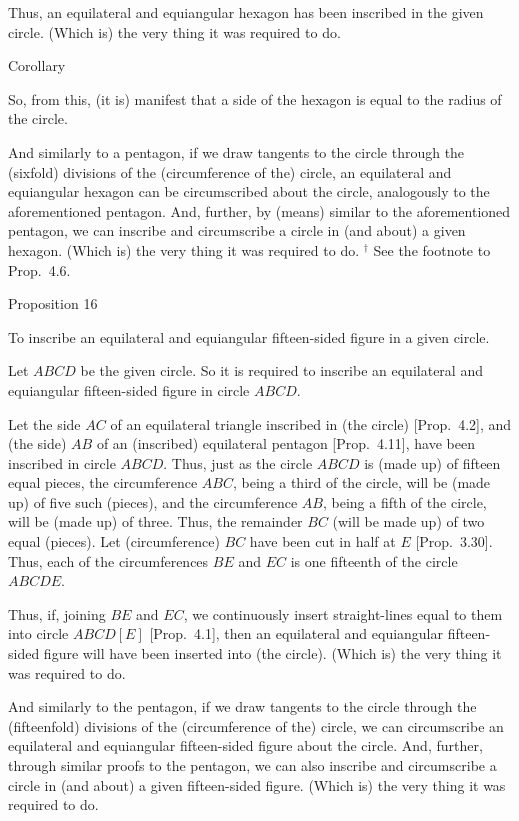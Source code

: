  Thus, an equilateral and equiangular hexagon has been inscribed
 in the given circle. (Which is) the very thing it was required to do.\\
 
 \begin{center}
{\large Corollary}
\end{center}\vspace*{-7pt}

So, from this, (it is) manifest that a side of the hexagon is equal
to the radius of the circle.

And similarly to  a pentagon, if we draw  tangents to the circle through
the (sixfold) divisions of the (circumference of the) circle, an equilateral and equiangular hexagon
can be circumscribed about the circle, analogously to the aforementioned pentagon. And, further, by (means) similar to the aforementioned pentagon,
we can inscribe and circumscribe a circle in (and about) a given hexagon. 
(Which
is) the very thing it was required to do.
{\footnotesize \noindent$^\dag$ See the
footnote to Prop.~4.6.} 


\begin{center}
{\large Proposition 16}
\end{center}

To inscribe an equilateral and equiangular fifteen-sided figure in a given circle.

\epsfysize=2.2in
\centerline{}

Let $ABCD$ be the given circle. So it is required to inscribe an equilateral
and equiangular fifteen-sided figure in circle $ABCD$.

Let the side $AC$ of an equilateral triangle inscribed in (the circle) [Prop.~4.2],
and (the side) $AB$ of an (inscribed) equilateral pentagon [Prop.~4.11],
 have been inscribed in circle $ABCD$.
 Thus,   just as the circle $ABCD$ is (made up) of fifteen equal pieces, the
 circumference $ABC$, being a third of the circle, will be (made up) of five
 such (pieces), and the
 circumference $AB$, being a fifth of the circle, will be (made up) of  three.
 Thus, the remainder $BC$ (will be made up) of two equal (pieces).
 Let (circumference) $BC$ have been cut in half at $E$ [Prop.~3.30].
 Thus, each of the circumferences $BE$ and $EC$ is one fifteenth of the circle
 $ABCDE$.
 
 Thus, if, joining $BE$ and $EC$, we continuously insert straight-lines
 equal to them into circle $ABCD[E]$ [Prop.~4.1],
 then an equilateral and equiangular fifteen-sided figure will have been
 inserted into (the circle). (Which is) the very thing it was required to do.
 
 And similarly to the pentagon, if we draw  tangents to the circle through
the (fifteenfold) divisions of the (circumference of the) circle, we can
circumscribe an equilateral and equiangular fifteen-sided figure about
the circle. 
 And, further, through similar proofs to the  pentagon,
 we can also inscribe and circumscribe  a circle in (and about)  a given fifteen-sided 
  figure. (Which is) the very thing it was required to do.
\newpage
\thispagestyle{plain}~\\